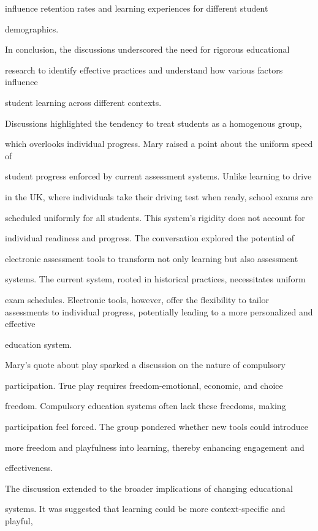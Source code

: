 \documentclass[11pt]{article}
\begin{document}
influence retention rates and learning experiences for different student

demographics.

In conclusion, the discussions underscored the need for rigorous educational

research to identify effective practices and understand how various factors influence

student learning across different contexts.

Discussions highlighted the tendency to treat students as a homogenous group,

which overlooks individual progress. Mary raised a point about the uniform speed of

student progress enforced by current assessment systems. Unlike learning to drive

in the UK, where individuals take their driving test when ready, school exams are

scheduled uniformly for all students. This system's rigidity does not account for

individual readiness and progress. The conversation explored the potential of

electronic assessment tools to transform not only learning but also assessment

systems. The current system, rooted in historical practices, necessitates uniform

exam schedules. Electronic tools, however, offer the flexibility to tailor assessments to individual progress, potentially leading to a more personalized and effective

education system.

Mary's quote about play sparked a discussion on the nature of compulsory

participation. True play requires freedom-emotional, economic, and choice

freedom. Compulsory education systems often lack these freedoms, making

participation feel forced. The group pondered whether new tools could introduce

more freedom and playfulness into learning, thereby enhancing engagement and

effectiveness.

The discussion extended to the broader implications of changing educational

systems. It was suggested that learning could be more context-specific and playful,
\end{document}
